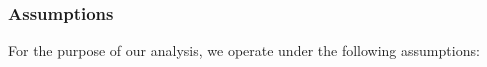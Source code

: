 \documentclass[pdftex,twocolumn,epjc3]{svjour3}
\newcommand{\normal}{\mathrm{n}}
\newcommand{\dispute}{\mathrm{d}}
\newcommand{\abnormal}{\overline{\mathrm{n}}}
\newcommand{\abdispute}{\overline{\mathrm{d}}}
\begin{document}





\subsubsection{Assumptions}\label{sec:assumptions}

For the purpose of our analysis, we operate under the following assumptions:
\end{document}
